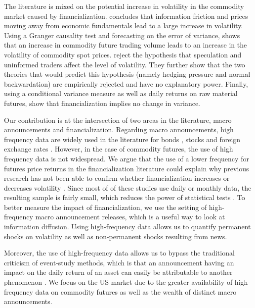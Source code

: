 \documentclass[12pt]{article}
\begin{document}
The literature is mixed on the potential increase in volatility in the commodity market caused by financialization. \citet{singleton2014investor} concludes that information friction and prices moving away from economic fundamentals lead to a large increase in volatility. Using a Granger causality test and forecasting on the error of variance, \citet{yang2005futures} shows that an increase in commodity future trading volume leads to an increase in the volatility of commodity spot prices. \citet{bryant2006causality} reject the hypothesis that speculation and uninformed traders affect the level of volatility. They further show that the two theories that would predict this hypothesis (namely hedging pressure and normal backwardation) are empirically rejected and have no explanatory power. Finally, using a conditional variance measure as well as daily returns on raw material futures, \citet{bohl2013does} show that financialization implies no change in variance.

Our contribution is at the intersection of two areas in the literature, macro announcements and financialization. Regarding macro announcements, high frequency data are widely used in the literature for bonds  \citep{andersen2007real, hu2013noise, balduzzi2001economic,lee1995oil, hautsch2011impact, kurov2019price}, stocks \citep{andersen2007real,bernile2016can,kurov2019price} and foreign exchange rates \citep{lee1995oil,andersen2003micro}. However, in the case of commodity futures, the use of high frequency data is not widespread. We argue that the use of a lower frequency for futures price returns in the financialization literature could explain why previous research has not been able to confirm whether financialization increases or decreases volatility \citep{tang2012index,brunetti2016speculators,irwin2012testing,stoll2010commodity,alquist2013role}. Since most of of these studies use daily or monthly data, the resulting sample is fairly small, which reduces the power of statistical tests \citep{irwin2009devil}.  To better measure the impact of financialization, we use the setting of high-frequency macro announcement releases, which is a useful way to look at information diffusion. Using high-frequency data allows us to quantify permanent shocks on volatility as well as non-permanent shocks resulting from news.

Moreover, the use of high-frequency data allows us to bypass the traditional criticism of event-study methods, which is that an announcement having an impact on the daily return of an asset can easily be attributable to another phenomenon \citep{kothari2007econometrics}. We focus on the US market due to the greater availability of high-frequency data on commodity futures as well as the wealth of distinct macro announcements.
\end{document}
